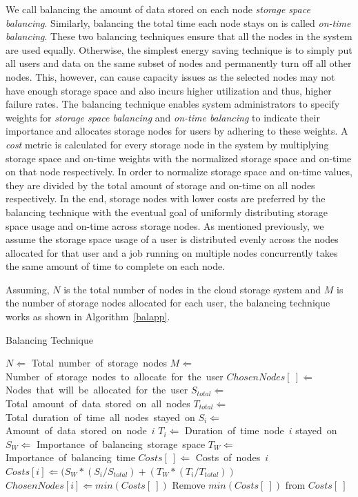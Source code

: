\documentclass[preprint,12pt]{elsarticle}
\begin{document}
We call balancing the amount of data stored on each node \textit{storage space balancing}.
Similarly, balancing the total time each node stays on is
called \textit{on-time balancing}. These two balancing
techniques ensure that all the nodes in the system are used equally.
Otherwise, the simplest energy saving technique is to simply put all
users and data on the same subset of nodes and permanently turn off
all other nodes. This, however, can cause capacity issues as the
selected nodes may not have enough storage space and also incurs
higher utilization and thus, higher failure rates.
The balancing technique enables system administrators to specify weights for \textit{storage space
balancing} and \textit{on-time balancing} to indicate their importance and allocates
storage nodes for users by adhering to these weights. A \textit{cost} metric is calculated for every
storage node in the system by multiplying storage space and on-time weights with the normalized 
storage space and on-time on that node respectively. In order to normalize storage space and
on-time values, they are divided by the total amount of storage and on-time on all nodes
respectively. In the end, storage nodes with lower costs are preferred by the balancing technique
with the eventual goal of uniformly distributing storage space usage and on-time across storage nodes.
As mentioned previously, we assume the storage space usage of a user is distributed evenly across the
nodes allocated for that user and a job running on multiple nodes concurrently takes the same amount
of time to complete on each node.

Assuming, $N$ is the total number of nodes in the cloud storage system and $M$ is the number
of storage nodes allocated for each user, the balancing technique works as shown in Algorithm~\ref{balapp}.

\begin{algorithm}[!htbp]
\caption{Balancing Technique}
\label{balapp}
\begin{algorithmic}[1]
    \STATE $N \Leftarrow$ Total\ number\ of\ storage\ nodes
    \STATE $M \Leftarrow$ Number\ of\ storage\ nodes\ to\ allocate\ for\ the\ user
    \STATE $ChosenNodes[\ ] \Leftarrow$ Nodes\ that\ will\ be\ allocated\ for\ the\ user
    \STATE $S_{total} \Leftarrow$ Total\ amount\ of\ data\ stored\ on\ all\ nodes
    \STATE $T_{total} \Leftarrow$ Total\ duration\ of\ time\ all\ nodes\ stayed\ on
    \STATE $S_i \Leftarrow$ Amount\ of\ data\ stored\ on\ node\ $i$
    \STATE $T_i \Leftarrow$ Duration\ of\ time\ node\ $i$ stayed\ on
    \STATE $S_W \Leftarrow$ Importance\ of\ balancing\ storage\ space
    \STATE $T_W \Leftarrow$ Importance\ of\ balancing\ time
    \STATE $Costs[\ ] \Leftarrow$ Costs\ of\ nodes\ $i$
        \STATE $Costs[i] \Leftarrow (S_W * (S_i/S_{total}) + (T_W * (T_i/T_{total}))$
    \ENDFOR
        \STATE $ChosenNodes[i] \Leftarrow min(Costs[\ ])$
        \STATE Remove $min(Costs[\ ])$ from $Costs[\ ]$
    \ENDFOR
\end{algorithmic}
\end{algorithm}
\end{document}

